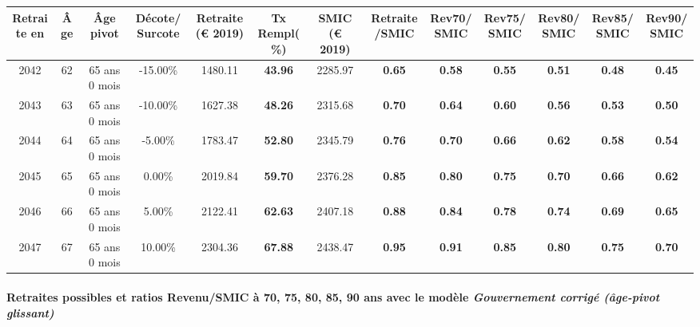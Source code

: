 { \scriptsize \begin{center} 
\begin{tabular}[htb]{|c|c||c|c||c|c||c||c|c|c|c|c|c|} 
\hline 
 Retraite en &  Âge &  Âge pivot &  Décote/Surcote &  Retraite (\euro{} 2019) &  Tx Rempl(\%) &  SMIC (\euro{} 2019) &  Retraite/SMIC &  Rev70/SMIC &  Rev75/SMIC &  Rev80/SMIC &  Rev85/SMIC &  Rev90/SMIC \\ 
\hline \hline 
 2042 &  62 &  65 ans 0 mois &  -15.00\% &  1480.11 &  {\bf 43.96} &  2285.97 &  {\bf {\color{red} 0.65}} &  {\bf {\color{red} 0.58}} &  {\bf {\color{red} 0.55}} &  {\bf {\color{red} 0.51}} &  {\bf {\color{red} 0.48}} &  {\bf {\color{red} 0.45}} \\ 
\hline 
 2043 &  63 &  65 ans 0 mois &  -10.00\% &  1627.38 &  {\bf 48.26} &  2315.68 &  {\bf {\color{red} 0.70}} &  {\bf {\color{red} 0.64}} &  {\bf {\color{red} 0.60}} &  {\bf {\color{red} 0.56}} &  {\bf {\color{red} 0.53}} &  {\bf {\color{red} 0.50}} \\ 
\hline 
 2044 &  64 &  65 ans 0 mois &  -5.00\% &  1783.47 &  {\bf 52.80} &  2345.79 &  {\bf {\color{red} 0.76}} &  {\bf {\color{red} 0.70}} &  {\bf {\color{red} 0.66}} &  {\bf {\color{red} 0.62}} &  {\bf {\color{red} 0.58}} &  {\bf {\color{red} 0.54}} \\ 
\hline 
 2045 &  65 &  65 ans 0 mois &  0.00\% &  2019.84 &  {\bf 59.70} &  2376.28 &  {\bf {\color{red} 0.85}} &  {\bf {\color{red} 0.80}} &  {\bf {\color{red} 0.75}} &  {\bf {\color{red} 0.70}} &  {\bf {\color{red} 0.66}} &  {\bf {\color{red} 0.62}} \\ 
\hline 
 2046 &  66 &  65 ans 0 mois &  5.00\% &  2122.41 &  {\bf 62.63} &  2407.18 &  {\bf {\color{red} 0.88}} &  {\bf {\color{red} 0.84}} &  {\bf {\color{red} 0.78}} &  {\bf {\color{red} 0.74}} &  {\bf {\color{red} 0.69}} &  {\bf {\color{red} 0.65}} \\ 
\hline 
 2047 &  67 &  65 ans 0 mois &  10.00\% &  2304.36 &  {\bf 67.88} &  2438.47 &  {\bf {\color{red} 0.95}} &  {\bf {\color{red} 0.91}} &  {\bf {\color{red} 0.85}} &  {\bf {\color{red} 0.80}} &  {\bf {\color{red} 0.75}} &  {\bf {\color{red} 0.70}} \\ 
\hline 
\hline 
\end{tabular} 
\end{center} } 
\paragraph{Retraites possibles et ratios Revenu/SMIC à 70, 75, 80, 85, 90 ans avec le modèle \emph{Gouvernement corrigé (âge-pivot glissant)}}  
 
